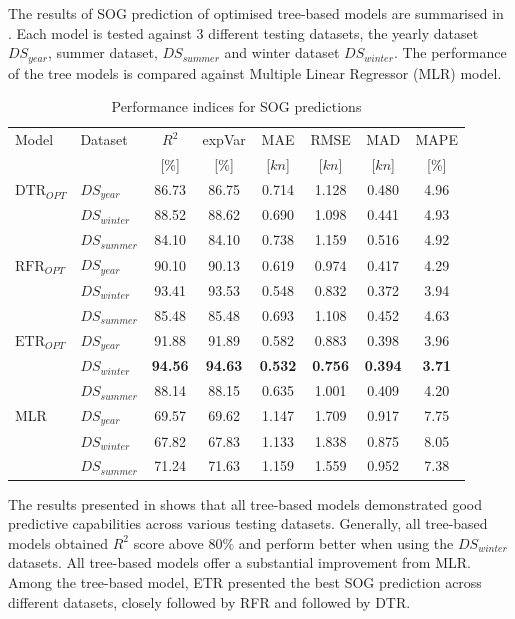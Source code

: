 The results of SOG prediction of optimised tree-based models are summarised in . Each model is tested against 3 different testing datasets, the yearly dataset $DS_{year}$, summer dataset, $DS_{summer}$ and winter dataset $DS_{winter}$. The performance of the tree models is compared against Multiple Linear Regressor (MLR) model.

\begin{table}[ht]
    \footnotesize
    \centering
    {\begin{tabular}{ l l c c c c c c }
    \hline
    Model & Dataset & $R^2$ & expVar & MAE & RMSE & MAD & MAPE \\
    & & [$\%$] & [$\%$] & [$kn$] & [$kn$] & [$kn$] & [$\%$]  \\ 
    \hline
    $\text{DTR}_{OPT}$ & $DS_{year}$ & 86.73 & 86.75 & 0.714 & 1.128  & 0.480 & 4.96  \\
    & $DS_{winter}$ & 88.52 & 88.62 & 0.690 & 1.098 & 0.441 & 4.93 \\
    & $DS_{summer}$ & 84.10 & 84.10 & 0.738 & 1.159 & 0.516 & 4.92 \\
    $\text{RFR}_{OPT}$ & $DS_{year}$  & 90.10 & 90.13 & 0.619 & 0.974 & 0.417 & 4.29 \\
    & $DS_{winter}$ & 93.41 & 93.53 & 0.548 & 0.832 & 0.372 & 3.94 \\
    & $DS_{summer}$ & 85.48 & 85.48 & 0.693 & 1.108 & 0.452 & 4.63 \\
    $\text{ETR}_{OPT}$ & $DS_{year}$ & 91.88 & 91.89 & 0.582 & 0.883 & 0.398 & 3.96 \\
    & $DS_{winter}$ & \textbf{94.56} & \textbf{94.63} & \textbf{0.532} & \textbf{0.756} & \textbf{0.394} & \textbf{3.71} \\
    & $DS_{summer}$ & 88.14 & 88.15 & 0.635 & 1.001 & 0.409 & 4.20 \\
    MLR & $DS_{year}$ & 69.57 & 69.62 & 1.147 & 1.709 & 0.917 & 7.75 \\
    & $DS_{winter}$ & 67.82 & 67.83 & 1.133 & 1.838 & 0.875 & 8.05 \\
    & $DS_{summer}$ & 71.24 & 71.63 & 1.159 & 1.559 & 0.952 & 7.38 \\
    \hline
    \end{tabular}}
\caption{Performance indices for SOG predictions}\label{tbl:testing_dataset_sog_result}
\end{table}

The results presented in  shows that all tree-based models demonstrated good predictive capabilities across various testing datasets. Generally, all tree-based models obtained $R^2$ score above $80\%$ and perform better when using the $DS_{winter}$ datasets. All tree-based models offer a substantial improvement from MLR. Among the tree-based model, ETR presented the best SOG prediction across different datasets, closely followed by RFR and followed by  DTR.\\ 

